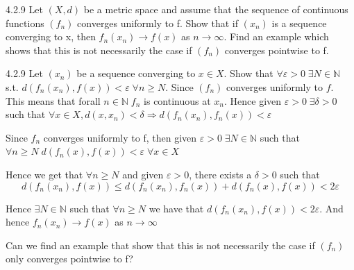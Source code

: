 \documentclass[a4paper,norsk]{article}
\renewcommand{\geq}{\geqslant}
\renewcommand{\leq}{\leqslant}
\renewcommand{\epsilon}{\varepsilon}
\begin{document}
\begin{oppgavebox}{4.2.9}{}
Let $ \left( X, d \right)  $ be a metric space and assume that the sequence of continuous functions $ \left( f_n \right)  $ converges uniformly to f. Show that if $ \left( x_n \right)  $ is a sequence converging to x, then $ f_n(x_n) \to f(x) $ as $ n \to \infty $. Find an example which shows that this is not necessarily the case if $ \left( f_n \right)  $  converges pointwise to f.

\begin{proofbox}{4.2.9}{}
  Let $ \left(  x_n \right)  $ be a sequence converging to $ x \in X $. Show that $ \forall \epsilon > 0 \; \exists N \in \mathbb{N} $ s.t. $ d \left( f_n(x_n), f(x) \right) < \epsilon \; \forall n \geq N $. Since $ \left( f_n \right)  $ converges uniformly to $ f $. This means that forall $ n \in \mathbb{N} \; f_n  $ is continuous at $ x_n $. Hence given $ \epsilon > 0 \; \exists \delta > 0  $ such that $ \forall x \in X, d \left( x, x_n \right) < \delta \Rightarrow d \left( f_n(x_n), f_n(x) \right) < \epsilon   $
  
  Since $ f_n $ converges uniformly to f, then given $ \epsilon > 0 \; \exists  N \in \mathbb{N} $ such that $ \forall n \geq N \; d \left( f_n(x), f(x) \right) < \epsilon \; \forall x \in X $  


  Hence we get that $ \forall n \geq N $ and given $ \epsilon > 0 $, there exists a $ \delta > 0 $   such that
  \[
      d \left( f_n(x_n), f(x) \right) \leq d \left( f_n(x_n), f_n(x) \right) + d \left( f_n(x), f(x) \right) < 2 \epsilon 
  \]

  Hence $ \exists N \in \mathbb{N} $ such that $ \forall n \geq N $ we have that $ d \left( f_n(x_n), f(x) \right) < 2 \epsilon  $. And hence $ f_n \left( x_n \right) \to f(x) $ as $ n \to \infty $ 





  Can we find an example that show that this is not necessarily the case if $ \left( f_n \right)  $ only converges pointwise to f? 
  
\end{proofbox}
\end{oppgavebox}
\end{document}
